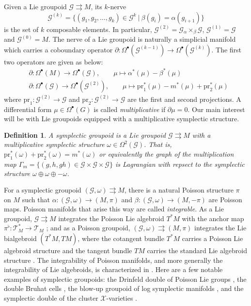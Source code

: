 \documentclass{amsart}
\newtheorem{definition}[theorem]{Definition}
\numberwithin{equation}{section}
\newcommand{\cG}{\mathcal{G}}
\newcommand{\cX}{\mathcal{X}}
\newcommand{\cT}{\mathcal{T}}
\newcommand{\rra}{\rightrightarrows}
\begin{document}
Given a Lie groupoid $\cG \rra M$, its $k$-nerve 
\[
	\cG^{(k)} = \{(g_1, g_2, \ldots, g_k) \in \cG^k ~|~ \beta(g_i) = \alpha(g_{i+1})\}
\]
is the set of $k$ composable elements. In particular, $\cG^{(2)} = \cG {_\alpha \times_\beta} \cG$, $\cG^{(1)} = \cG$ and $\cG^{(0)} = M$. The nerve of a Lie groupoid is naturally a simplicial manifold which carries a coboundary operator $\partial: \Omega^\bullet(\cG^{(k-1)}) \to \Omega^\bullet(\cG^{(k)})$. The first two operators are given as below:
\begin{align}
	& \partial: \Omega^\bullet(M) \to \Omega^\bullet(\cG), \qquad \mu \mapsto \alpha^*(\mu) - \beta^*(\mu) \\
	& \partial: \Omega^\bullet(\cG) \to \Omega^\bullet(\cG^{(2)}), \qquad \mu \mapsto \mathrm{pr}_1^*(\mu) - m^*(\mu) + \mathrm{pr}_2^*(\mu)
\end{align}
where $\mathrm{pr}_1: \cG^{(2)} \to \cG$ and $\mathrm{pr}_2: \cG^{(2)} \to \cG$ are the first and second projections. A differential form $\mu \in \Omega^\bullet(G)$ is called \emph{multiplicative} if $\partial \mu = 0$. Our main interest will be with Lie groupoids equipped with a multiplicative symplectic structure.
\begin{definition}
  A \emph{symplectic groupoid} is a Lie groupoid $\cG \rra M$ with a multiplicative symplectic structure $\omega \in \Omega^2(\cG)$.
  That is, $\mathrm{pr}_1^*(\omega)+\mathrm{pr}_2^*(\omega) = m^*(\omega)$ or equivalently the graph of the multiplication map $\Gamma_m = \{(g, h, gh) \in \cG \times \cG \times \cG\}$ is Lagrangian with repsect to the symplectic structure $\omega \oplus \omega \oplus -\omega$.
\end{definition}



For a symplectic groupoid $(\cG, \omega) \rra M$, there is a natural Poisson structure $\pi$ on $M$ such that $\alpha: (\cG, \omega) \to (M, \pi)$ and $\beta: (\cG, \omega) \to (M, -\pi)$ are Poisson maps.
Poisson manifolds that arise this way are called \emph{integrable}.
As a Lie groupoid, $\cG \rra M$ integrates the Poisson Lie algebroid $T^*M$ with the anchor map $\pi^\flat: \cT^*_M \to \cT_M$ \cite{MR866024}; and as a Poisson groupoid, $(\cG, \omega) \rra (M, \pi)$ integrates the Lie bialgebroid $(T^*M, TM)$, where the cotangent bundle $T^*M$ carries a Poisson Lie algebroid structure and the tangent bundle $TM$ carries the standard Lie algebroid structure \cite{MR1262213}.
The integrability of Poisson manifolds, and more generally the integrability of Lie algebroids, is characterized in \cite{MR1973056, MR2128714}.
Here are a few notable examples of symplectic groupoids: the Drinfeld double of Poisson Lie groups \cite{MR1054741}, the double Bruhat cells \cite{LuM16}, the blow-up groupoid of log symplectic manifolds \cite{MR3214314}, and the symplectic double of the cluster $\cX$-varieties \cite{MR2470108}.
\end{document}
